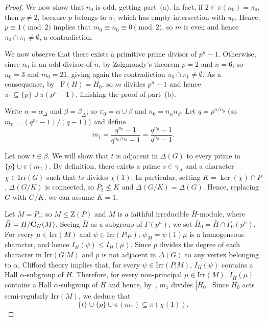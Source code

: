 \documentclass{amsart}
\def\irr#1{\mathrm{Irr}(#1)}
\begin{document}
\begin{proof}
We now show that $n_0$ is odd, getting part~(a). In fact,  if $2 \in \pi(n_0) = \pi_0$, then $p \neq 2$, because $p$ belongs to $\pi_1$ which
has empty intersection with $\pi_0$. Hence, $p \equiv 1 \pmod 2$ implies that   $m_0  \equiv n_0 \equiv 0 \pmod 2$, so
$m$ is even and hence $\pi_0\cap \pi_1 \neq \emptyset$, a contradiction. 

We now observe that there exists  a primitive prime divisor of  $p^n -1$. Otherwise, since $n_0$ is an odd divisor of $n$, by Zsigmondy's theorem
$p=2$ and $n = 6$; so $n_0= 3$ and $m_0 =21$, giving again the contradiction $\pi_0\cap \pi_1 \neq \emptyset$.
As a consequence, by~\cite[Lemma 3.7]{CDPS} $\mathrm{F}(H) = H_0$, so $m$ divides $p^n -1$ and hence 
 $\pi_1 \subseteq \{ p \} \cup \pi(p^n-1)$, finishing the proof of  part~(b).


Write $\alpha = \alpha_{\Delta}$ and $\beta = \beta_{\Delta}$; 
so $\pi_0  = \alpha \cup \beta$ and  $n_0 = n_{\alpha} n_{\beta}$. Let $q = p^{n/n_0}$ (so $m_0 = (q^{n_0}-1)/(q-1)$)   and define
$$m_1 = \frac{q^{n_0}-1}{q^{n_0/n_{\alpha}}-1}  = \frac{q^{n_0}-1}{q^{n_{\beta}}-1}.$$


Let now $t \in \beta$. We will show that $t$ is adjacent in $\Delta(G)$ to every prime in $\{p\}\cup\pi(m_1)$.
By definition, there exists a prime $s \in  \gamma_{\Delta}$ and a character
$\chi\in \irr G $ such that $ts$ divides $\chi(1)$.
In particular, setting $K = \ker(\chi) \cap P$,  $\Delta(G/K)$ is connected, so $P_3 \not\leq K$ and
$\Delta(G/K) = \Delta(G)$. Hence, 
replacing $G$ with $G/K$, we can assume  $K = 1$.

Let $M = P_c $;  so $M\leq \mathrm{Z}(P)$ and $M$ is a faithful irreducible  $\bar H$-module, where  $\bar H= H/{\bf C}_H(M)$.
Seeing $\bar H$ as a subgroup of $\Gamma(p^n)$, we set $\bar H_0=\bar H\cap \Gamma_0(p^n)$.
For every $\mu \in \irr M$ and $\psi \in \irr{P|\mu}$, $\psi_M = \psi(1)\mu$  is a homogeneous character, and  hence
$I_H(\psi) \leq I_H(\mu)$.
Since $p$ divides the degree of each character in $\irr{G|M}$ and $p$ is not adjacent in $\Delta(G)$ to any vertex belonging
to $\alpha$, 
Clifford theory implies that, for every $\psi \in \irr{P|M}$, $I_H(\psi)$ contains a
Hall $\alpha$-subgroup of $H$. Therefore, for every non-principal $\mu \in \irr M$, $I_{\bar H}(\mu)$ contains a
Hall $\alpha$-subgroup of $\bar H$ and  hence, by~\cite[Lemma~3.5]{CDPS},   $m_1$ divides $|\bar H_0|$.   
Since $\bar H_0$ acts semi-regularly $\irr M$, we  deduce that
\begin{equation}
  \label{eq:d}
\{t\}\cup \{ p\} \cup \pi(m_1)\subseteq \pi(\chi(1)).  
\end{equation}


\end{proof}
\end{document}
